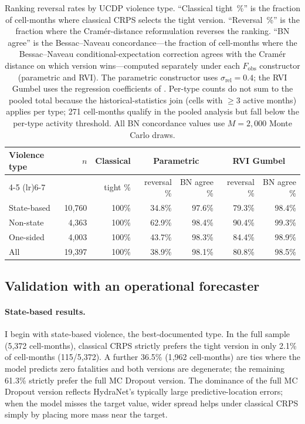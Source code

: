 \begin{table}[h]
    \centering
    \small
    \begin{tabular}{lrrrrrr}
        \toprule
        Violence type & $n$ & Classical & \multicolumn{2}{c}{Parametric} & \multicolumn{2}{c}{RVI Gumbel} \\
        \cmidrule(lr){4-5} \cmidrule(lr){6-7}
         & & tight \% & reversal \% & BN agree \% & reversal \% & BN agree \% \\
        \midrule
        State-based & 10{,}760 & 100\% & 34.8\% & 97.6\% & 79.3\% & 98.4\% \\
        Non-state & 4{,}363 & 100\% & 62.9\% & 98.4\% & 90.4\% & 99.3\% \\
        One-sided & 4{,}003 & 100\% & 43.7\% & 98.3\% & 84.4\% & 98.9\% \\
        \midrule
        All & 19{,}397 & 100\% & 38.9\% & 98.1\% & 80.8\% & 98.5\% \\
        \bottomrule
    \end{tabular}
    \caption{Ranking reversal rates by UCDP violence type. ``Classical tight~\%'' is the fraction of cell-months where classical CRPS selects the tight version. ``Reversal~\%'' is the fraction where the Cram\'er-distance reformulation reverses the ranking. ``BN agree'' is the Bessac--Naveau concordance---the fraction of cell-months where the Bessac--Naveau conditional-expectation correction agrees with the Cram\'er distance on which version wins---computed separately under each $F_\text{obs}$ constructor (parametric and RVI). The parametric constructor uses $\sigma_\text{rel} = 0.4$; the RVI Gumbel uses the regression coefficients of \citet{vesco2026uncertainty}. Per-type counts do not sum to the pooled total because the historical-statistics join (cells with $\geq 3$ active months) applies per type; 271 cell-months qualify in the pooled analysis but fall below the per-type activity threshold. All BN concordance values use $M = 2{,}000$ Monte Carlo draws.}
    \label{tab:per_type}
\end{table}

\subsection{Validation with an operational forecaster}

\paragraph{State-based results.}
I begin with state-based violence, the best-documented type. In the full sample (5{,}372 cell-months), classical CRPS strictly prefers the tight version in only 2.1\% of cell-months (115/5{,}372). A further 36.5\% (1{,}962 cell-months) are ties where the model predicts zero fatalities and both versions are degenerate; the remaining 61.3\% strictly prefer the full MC Dropout version. The dominance of the full MC Dropout version reflects HydraNet's typically large predictive-location errors; when the model misses the target value, wider spread helps under classical CRPS simply by placing more mass near the target.

